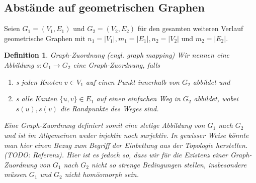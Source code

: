 \documentclass[a4paper, 12pt, twoside]{article}
\theoremstyle{Format1} %
\newtheorem{Def}{Definition}[section]       %
\begin{document}
\subsection{Abstände auf geometrischen Graphen}

Seien $ G_1=(V_1, E_1) $ und $ G_2=(V_2, E_2) $ für den gesamten weiteren Verlauf geometrische Graphen mit
$n_1 = |V_1|, m_1 = |E_1|, n_2 = |V_2|$ und $m_2 = |E_2|$.

\begin{Def} \label{Definition Graph-Zuordnung}
	Graph-Zuordnung (engl. graph mapping)
	Wir nennen eine Abbildung $s: G_1 \to G_2 $ eine \textit{Graph-Zuordnung}, falls
    	\begin{enumerate}
		\item[1)] s jeden Knoten $ v \in V_1 $ auf einen Punkt innerhalb von $ G_2 $ abbildet und
		\item[2)] s alle Kanten $ \{u,v\} \in E_1 $ auf einen einfachen Weg in $G_2$ abbildet, wobei $s(u), s(v)$ die Randpunkte des Weges sind.
    	\end{enumerate}

	Eine Graph-Zuordnung definiert somit eine stetige Abbildung von $ G_1 $ nach $ G_2 $ und ist im Allgemeinen weder injektiv noch surjektiv.
	In gewisser Weise könnte man hier einen Bezug zum Begriff der \textit{Einbettung} aus der Topologie herstellen. (TODO: Referenz).
	Hier ist es jedoch so, dass wir für die Existenz einer Graph-Zuordnung von $ G_1 $ nach $ G_2 $ nicht so strenge Bedingungen stellen, insbesondere
	müssen $G_1$ und $G_2$ nicht homöomorph sein.
\end{Def}
\end{document}
